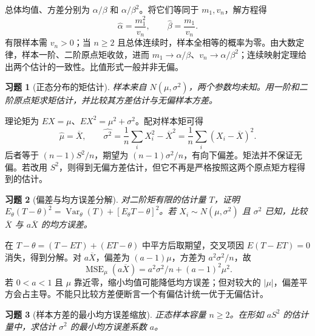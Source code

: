 \documentclass[12pt,fontset=fandol]{ctexart}
\newtheorem{exercise}{习题}[section]
\begin{document}
\begin{solve}\label{a:B9.3}总体均值、方差分别为 $\alpha/\beta$ 和 $\alpha/\beta^2$。将它们等同于 $m_1,v_n$，解方程得\[\widehat\alpha=\frac{m_1^2}{v_n},\qquad\widehat\beta=\frac{m_1}{v_n}.\]有限样本需 $v_n>0$；当 $n\ge2$ 且总体连续时，样本全相等的概率为零。由大数定律，样本一阶、二阶原点矩收敛，进而 $m_1\to\alpha/\beta$、$v_n\to\alpha/\beta^2$；连续映射定理给出两个估计的一致性。比值形式一般并非无偏。\end{solve}

\begin{exercise}[正态分布的矩估计]\label{q:B9.4}
样本来自 $N(\mu,\sigma^2)$，两个参数均未知。用一阶和二阶原点矩求矩估计，并比较其方差估计与无偏样本方差。\par{}
\end{exercise}

\begin{solve}\label{a:B9.4}理论矩为 $EX=\mu$、$EX^2=\mu^2+\sigma^2$。配对样本矩可得\[\widehat\mu=\overline X,\qquad\widehat{\sigma^2}=\frac1n\sum_iX_i^2-\overline X^2=\frac1n\sum_i(X_i-\overline X)^2.\]后者等于 $(n-1)S^2/n$，期望为 $(n-1)\sigma^2/n$，有向下偏差。矩法并不保证无偏。若改用 $S^2$，则得到无偏方差估计，但它不再是严格按照这两个原点矩方程得到的估计。\end{solve}

\begin{exercise}[偏差与均方误差分解]\label{q:B9.5}
对二阶矩有限的估计量 $T$，证明 $E_\theta(T-\theta)^2=\operatorname{Var}_\theta(T)+[E_\theta T-\theta]^2$。若 $X_i\sim N(\mu,\sigma^2)$ 且 $\sigma^2$ 已知，比较 $\overline X$ 与 $a\overline X$ 的均方误差。\par{}
\end{exercise}

\begin{solve}\label{a:B9.5}在 $T-\theta=(T-ET)+(ET-\theta)$ 中平方后取期望，交叉项因 $E(T-ET)=0$ 消失，得到分解。对 $a\overline X$，偏差为 $(a-1)\mu$，方差为 $a^2\sigma^2/n$，故\[\operatorname{MSE}_\mu(a\overline X)=a^2\sigma^2/n+(a-1)^2\mu^2.\]若 $0<a<1$ 且 $\mu$ 靠近零，缩小均值可能降低均方误差；但对较大的 $|\mu|$，偏差平方会占主导。不能只比较方差便断言一个有偏估计统一优于无偏估计。\end{solve}

\begin{exercise}[样本方差的最小均方误差缩放]\label{q:B9.6}
正态样本容量 $n\ge2$。在形如 $aS^2$ 的估计量中，求估计 $\sigma^2$ 的最小均方误差系数 $a$。\par{}
\end{exercise}
\end{document}
